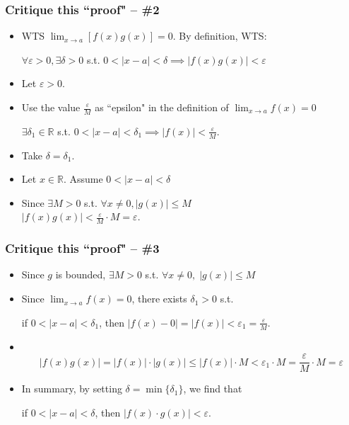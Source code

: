\begin{frame}[t]
	\frametitle{Critique this ``proof" -- \#2}
	\fontsize{13}{13}\selectfont
	\begin{itemize}
		\item WTS $\displaystyle \lim_{x \to a}\left[f(x) g(x) \right] =0$. By
			definition, WTS:

			\hfill $\displaystyle \forall \varepsilon>0, \exists \delta>0$ s.t.
			$\displaystyle 0<|x-a|<\delta \implies |f(x) g(x)|<\varepsilon$
			\vfill

		\item Let $\varepsilon >0$.
			\vfill

		\item Use the value $\displaystyle \frac{\varepsilon}{M}$ as ``epsilon" in
			the definition of $\displaystyle \lim_{x \to a}f(x) = 0$

			\hfill $\displaystyle \exists \delta_{1}\in \mathbb{R}$ s.t.
			$\displaystyle 0<|x-a|<\delta_{1}\implies |f(x)| < \frac{\varepsilon}{M}$.
			\vfill

		\item Take $\displaystyle \delta = \delta_{1}$.
			\vfill

		\item Let $\displaystyle x \in \mathbb{R}$. Assume
			$\displaystyle 0 < |x-a| <\delta$
			\vfill

		\item Since $\displaystyle \exists M>0$ s.t.
			$\displaystyle \forall x \neq 0, |g(x)| \leq M$ \\ \hfill
			$\displaystyle |f(x) g(x)| < \frac{\varepsilon}{M}\cdot M = \varepsilon$.
			\vfill
	\end{itemize}
\end{frame}

\begin{frame}[t]
	\frametitle{Critique this ``proof" -- \#3}
	\fontsize{13}{13}\selectfont
	\begin{itemize}
		\item Since $g$ is bounded, $\displaystyle \exists M >0$ \; s.t. \; \;$\displaystyle
			\forall x \neq 0, \; |g(x)| \leq M$
			\vfill

		\item Since $\displaystyle \lim_{x \to a}f(x)=0$, there exists
			$\displaystyle \delta_{1}>0$ s.t.

			if $\displaystyle 0<|x-a|<\delta_{1}$, \quad then \; $\displaystyle |f(x)-0
			| = |f(x)| <\varepsilon_{1}= \frac{\varepsilon}{M}$.
			\vfill

		\item \
			\vspace{-1cm}
			\[
				|f(x)g(x)| = |f(x)| \cdot |g(x)| \leq |f(x)| \cdot M < \varepsilon_{1}\cdot
				M = \frac{\varepsilon}{M}\cdot M = \varepsilon
			\]

		\item In summary, by setting $\displaystyle \delta = \min\{\delta_{1}\}$, we
			find that

			if $\displaystyle 0<|x-a|<\delta$, \quad then \; $\displaystyle |f(x) \cdot
			g(x)| < \varepsilon$.
			\vfill
	\end{itemize}
\end{frame}

